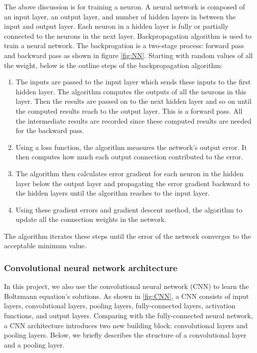 \documentclass{article}
\begin{document}
The above discussion is for training a neuron. A neural network is composed of an input layer, an output layer, and number of hidden layers in between the input and output layer. Each neuron in a hidden layer is fully or partially connected to the neurons in the next layer. Backpropagation algorithm is used to train a neural network. The backprogation is a two-stage process: forward pass and backward pass as shown in figure \ref{fig:NN}. Starting with random values of all the weight, below is the outline steps of the backpropagation algorithm:
\begin{enumerate}
\item The inputs are passed to the input layer which sends these inputs to the first hidden layer. The algorithm computes the outputs of all the neurons in this layer. Then the results are passed on to the next hidden layer and so on until the computed results reach to the output layer. This is a forward pass. All the intermediate results are recorded since these computed results are needed for the backward pass.
\item Using a loss function, the algorithm measures the network's output error. It then computes how much each output connection contributed to the error.
\item The algorithm then calculates error gradient for each neuron in the hidden layer below the output layer and propagating the error gradient backward to the hidden layers until the algorithm reaches to the input layer.
\item Using these gradient errors and gradient descent method, the algorithm to update all the connection weights in the network. 
\end{enumerate}
The algorithm iterates these steps until the error of the network converges to the acceptable minimum value.

\subsubsection{Convolutional neural network architecture} \label{CNN}
In this project, we also use the convolutional neural network (CNN) to learn the Boltzmann equation's solutions. As shown in \ref{fig:CNN}, a CNN consists of input layers, convolutional layers, pooling layers, fully-connected layers, activation functions, and output layers. Comparing with the fully-connected neural network, a CNN architecture introduces two new building block: convolutional layers and pooling layers. Below, we briefly describes the structure of a convolutional layer and a pooling layer.
\end{document}
